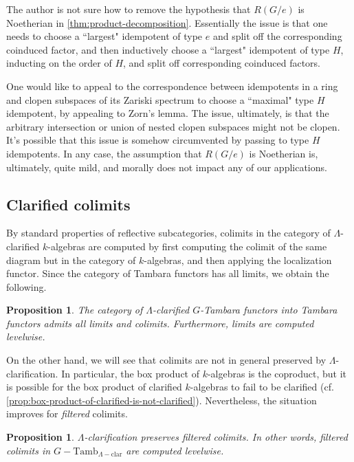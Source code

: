 \documentclass[11pt,dvipsnames]{amsart}
\newtheorem{proposition}[theorem]{Proposition}
\theoremstyle{BoldRemark}
\newcommand{\Tamb}{\mathrm{Tamb}}
\begin{document}
The author is not sure how to remove the hypothesis that $R(G/e)$ is Noetherian in \cref{thm:product-decomposition}. Essentially the issue is that one needs to choose a ``largest" idempotent of type $e$ and split off the corresponding coinduced factor, and then inductively choose a ``largest" idempotent of type $H$, inducting on the order of $H$, and split off corresponding coinduced factors.

One would like to appeal to the correspondence between idempotents in a ring and clopen subspaces of its Zariski spectrum to choose a ``maximal" type $H$ idempotent, by appealing to Zorn's lemma. The issue, ultimately, is that the arbitrary intersection or union of nested clopen subspaces might not be clopen. It's possible that this issue is somehow circumvented by passing to type $H$ idempotents. In any case, the assumption that $R(G/e)$ is Noetherian is, ultimately, quite mild, and morally does not impact any of our applications.

\subsection{Clarified colimits}

By standard properties of reflective subcategories, colimits in the category of $\Lambda$-clarified $k$-algebras are computed by first computing the colimit of the same diagram but in the category of $k$-algebras, and then applying the localization functor. Since the category of Tambara functors has all limits, we obtain the following.

\begin{proposition}
	The category of $\Lambda$-clarified $G$-Tambara functors into Tambara functors admits all limits and colimits. Furthermore, limits are computed levelwise.
\end{proposition}

On the other hand, we will see that colimits are not in general preserved by $\Lambda$-clarification. In particular, the box product of $k$-algebras is the coproduct, but it is possible for the box product of clarified $k$-algebras to fail to be clarified (cf. \cref{prop:box-product-of-clarified-is-not-clarified}). Nevertheless, the situation improves for \emph{filtered} colimits.

\begin{proposition}
	$\Lambda$-clarification preserves filtered colimits. In other words, filtered colimits in $G {-} \Tamb_{\Lambda {-} \mathrm{clar}}$ are computed levelwise.
\end{proposition}
\end{document}
